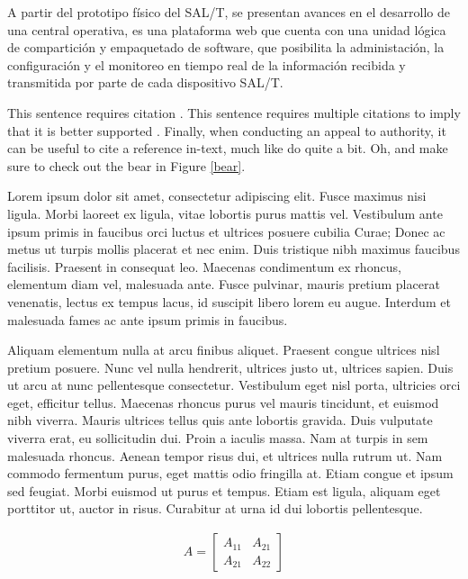 \documentclass[10pt, a4paper, twocolumn]{article} %
\begin{document}
A partir del prototipo físico del SAL/T, se presentan avances en el desarrollo de una central operativa, es una plataforma web que cuenta con una unidad lógica de compartición y empaquetado de software, que posibilita la administación, la configuración y el monitoreo en tiempo real de la información recibida y transmitida por parte de cada dispositivo SAL/T.




This sentence requires citation \citep{Reference1}. This sentence requires multiple citations to imply that it is better supported \citep{Reference2,Reference3}. Finally, when conducting an appeal to authority, it can be useful to cite a reference in-text, much like \cite{Reference1} do quite a bit. Oh, and make sure to check out the bear in Figure \ref{bear}.

Lorem ipsum dolor sit amet, consectetur adipiscing elit. Fusce maximus nisi ligula. Morbi laoreet ex ligula, vitae lobortis purus mattis vel. Vestibulum ante ipsum primis in faucibus orci luctus et ultrices posuere cubilia Curae; Donec ac metus ut turpis mollis placerat et nec enim. Duis tristique nibh maximus faucibus facilisis. Praesent in consequat leo. Maecenas condimentum ex rhoncus, elementum diam vel, malesuada ante. Fusce pulvinar, mauris pretium placerat venenatis, lectus ex tempus lacus, id suscipit libero lorem eu augue. Interdum et malesuada fames ac ante ipsum primis in faucibus.

Aliquam elementum nulla at arcu finibus aliquet. Praesent congue ultrices nisl pretium posuere. Nunc vel nulla hendrerit, ultrices justo ut, ultrices sapien. Duis ut arcu at nunc pellentesque consectetur. Vestibulum eget nisl porta, ultricies orci eget, efficitur tellus. Maecenas rhoncus purus vel mauris tincidunt, et euismod nibh viverra. Mauris ultrices tellus quis ante lobortis gravida. Duis vulputate viverra erat, eu sollicitudin dui. Proin a iaculis massa. Nam at turpis in sem malesuada rhoncus. Aenean tempor risus dui, et ultrices nulla rutrum ut. Nam commodo fermentum purus, eget mattis odio fringilla at. Etiam congue et ipsum sed feugiat. Morbi euismod ut purus et tempus. Etiam est ligula, aliquam eget porttitor ut, auctor in risus. Curabitur at urna id dui lobortis pellentesque.

\begin{align}
	A = 
	\begin{bmatrix}
		A_{11} & A_{21} \\
		A_{21} & A_{22}
	\end{bmatrix}
\end{align}
\end{document}
